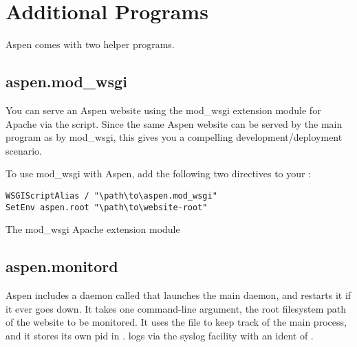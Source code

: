 \chapter{Additional Programs \label{programs}}

Aspen comes with two helper programs.

\section{aspen.mod_wsgi \label{aspen.mod-wsgi}}

You can serve an Aspen website using the mod_wsgi extension module for Apache
via the  script. Since the same Aspen website can be
served by the main  program as by mod_wsgi, this gives you a
compelling development/deployment scenario.

To use mod_wsgi with Aspen, add the following two directives to your
:

\begin{verbatim}
WSGIScriptAlias / "\path\to\aspen.mod_wsgi"
SetEnv aspen.root "\path\to\website-root"
\end{verbatim}


\begin{seealso}

{}{The mod_wsgi Apache extension module}

\end{seealso}


\section{aspen.monitord \label{aspen.monitord}}

Aspen includes a daemon called  that launches the main
 daemon, and restarts it if it ever goes down. It takes one
command-line argument, the root filesystem path of the website to be monitored.
It uses the  file to keep track of the main
 process, and it stores its own pid in
.  logs via the
 syslog facility with an ident of .
